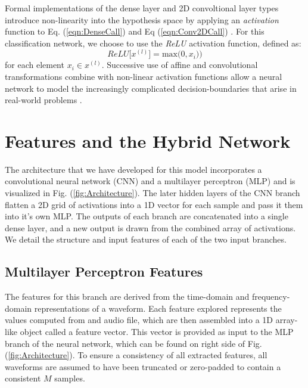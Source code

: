 \documentclass[conference,onecolumn,letterpaper]{IEEEtran}
\begin{document}
Formal implementations of the dense layer and 2D convoltional layer types introduce non-linearity into the hypothesis space by applying an \textit{activation} function to Eq. (\ref{eqn:DenseCall}) and Eq (\ref{eqn:Conv2DCall}) \cite{Goodfellow,Tensorflow}. For this classification network, we choose to use the \textit{ReLU} activation function, defined as:
\begin{equation}
\label{eqn:ReLU}
ReLU \big[ x^{(l)} \big] = \text{max} \big( 0, x_i) \big)
\end{equation} 
for each element $x_i \in x^{(l)}$. Successive use of affine and convolutional transformations combine with non-linear activation functions allow a neural network to model the increasingly complicated decision-boundaries that arise in real-world problems \cite{Geron,Goodfellow}.


\section{Features and the Hybrid Network}
\label{sec:Features}

The architecture that we have developed for this model incorporates a convolutional neural network (CNN) and a multilayer perceptron (MLP) and is visualized in Fig. (\ref{fig:Architecture}). The later hidden layers of the CNN branch flatten a 2D grid of activations into a 1D vector for each sample and pass it them into it's own MLP. The outputs of each branch are concatenated into a single dense layer, and a new output is drawn from the combined array of activations. We detail the structure and input features of each of the two input branches.


\subsection{Multilayer Perceptron Features}
\label{subsec:FeaturesMLP}

The features for this branch are derived from the time-domain and frequency-domain representations of a waveform. Each feature explored represents the values computed from and audio file, which are then assembled into a 1D array-like object called a feature vector. This vector is provided as input to the MLP branch of the neural network, which can be found on right side of Fig. (\ref{fig:Architecture}). To ensure a consistency of all extracted features, all waveforms are assumed to have been truncated or zero-padded to contain a consistent $M$ samples.
\end{document}
